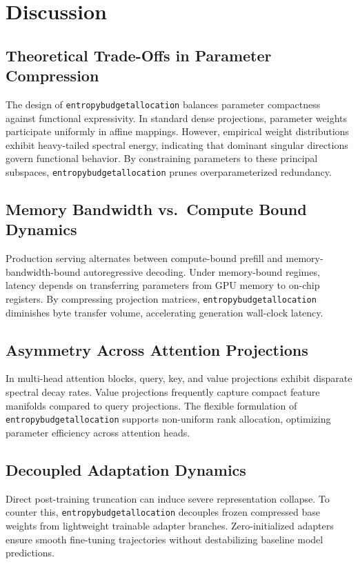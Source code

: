 \section{Discussion}

\subsection{Theoretical Trade-Offs in Parameter Compression}
The design of \texttt{entropybudgetallocation} balances parameter compactness against functional expressivity. In standard dense projections, parameter weights participate uniformly in affine mappings. However, empirical weight distributions exhibit heavy-tailed spectral energy, indicating that dominant singular directions govern functional behavior. By constraining parameters to these principal subspaces, \texttt{entropybudgetallocation} prunes overparameterized redundancy.

\subsection{Memory Bandwidth vs.\ Compute Bound Dynamics}
Production serving alternates between compute-bound prefill and memory-bandwidth-bound autoregressive decoding. Under memory-bound regimes, latency depends on transferring parameters from GPU memory to on-chip registers. By compressing projection matrices, \texttt{entropybudgetallocation} diminishes byte transfer volume, accelerating generation wall-clock latency.

\subsection{Asymmetry Across Attention Projections}
In multi-head attention blocks, query, key, and value projections exhibit disparate spectral decay rates. Value projections frequently capture compact feature manifolds compared to query projections. The flexible formulation of \texttt{entropybudgetallocation} supports non-uniform rank allocation, optimizing parameter efficiency across attention heads.

\subsection{Decoupled Adaptation Dynamics}
Direct post-training truncation can induce severe representation collapse. To counter this, \texttt{entropybudgetallocation} decouples frozen compressed base weights from lightweight trainable adapter branches. Zero-initialized adapters ensure smooth fine-tuning trajectories without destabilizing baseline model predictions.

